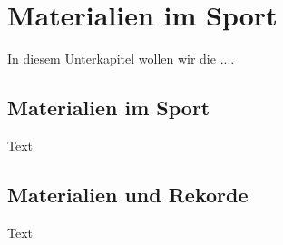 \section{Materialien im Sport}\label{kap:spo_materials}

In diesem Unterkapitel wollen wir die ....

\subsection{Materialien im Sport} \label{kap:spo_spomaterials}

Text

\subsection{Materialien und Rekorde} \label{kap:spo_records}

Text

